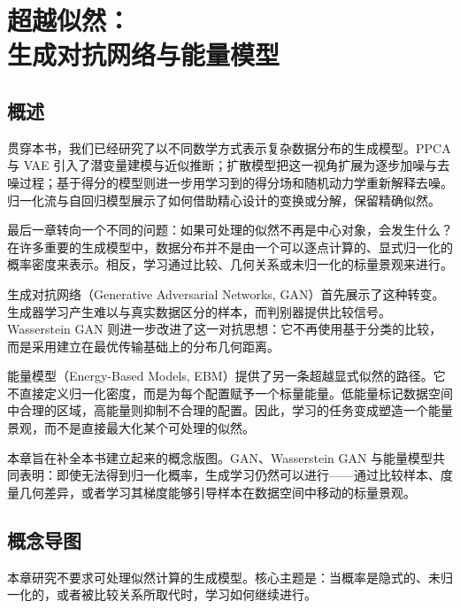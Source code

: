 \chapter[超越似然：生成对抗网络与能量模型]{超越似然：\\生成对抗网络与能量模型}

\section*{概述}
贯穿本书，我们已经研究了以不同数学方式表示复杂数据分布的生成模型。PPCA 与 VAE 引入了潜变量建模与近似推断；扩散模型把这一视角扩展为逐步加噪与去噪过程；基于得分的模型则进一步用学习到的得分场和随机动力学重新解释去噪。归一化流与自回归模型展示了如何借助精心设计的变换或分解，保留精确似然。

最后一章转向一个不同的问题：如果可处理的似然不再是中心对象，会发生什么？在许多重要的生成模型中，数据分布并不是由一个可以逐点计算的、显式归一化的概率密度来表示。相反，学习通过比较、几何关系或未归一化的标量景观来进行。

生成对抗网络（Generative Adversarial Networks, GAN）首先展示了这种转变。生成器学习产生难以与真实数据区分的样本，而判别器提供比较信号。Wasserstein GAN 则进一步改进了这一对抗思想：它不再使用基于分类的比较，而是采用建立在最优传输基础上的分布几何距离。

能量模型（Energy-Based Models, EBM）提供了另一条超越显式似然的路径。它不直接定义归一化密度，而是为每个配置赋予一个标量能量。低能量标记数据空间中合理的区域，高能量则抑制不合理的配置。因此，学习的任务变成塑造一个能量景观，而不是直接最大化某个可处理的似然。

本章旨在补全本书建立起来的概念版图。GAN、Wasserstein GAN 与能量模型共同表明：即使无法得到归一化概率，生成学习仍然可以进行——通过比较样本、度量几何差异，或者学习其梯度能够引导样本在数据空间中移动的标量景观。

\section*{概念导图}

本章研究不要求可处理似然计算的生成模型。核心主题是：当概率是隐式的、未归一化的，或者被比较关系所取代时，学习如何继续进行。

